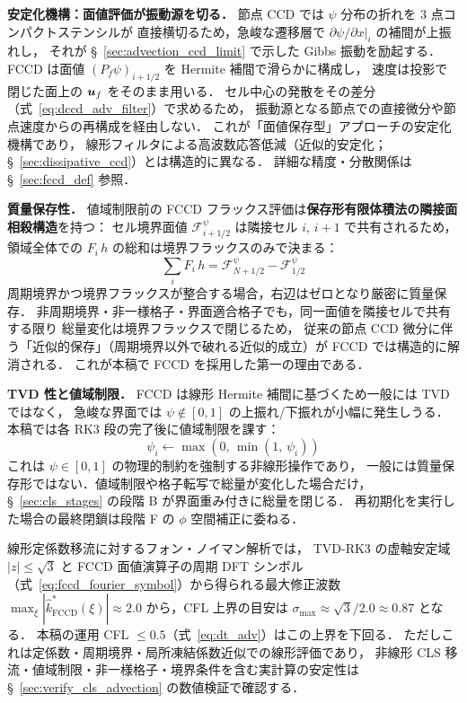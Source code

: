 \medskip
\noindent\textbf{安定化機構：面値評価が振動源を切る．}
節点 CCD では $\psi$ 分布の折れを 3 点コンパクトステンシルが
直接横切るため，急峻な遷移層で $\partial\psi/\partial x|_i$ の補間が上振れし，
それが §~\ref{sec:advection_ccd_limit} で示した Gibbs 振動を励起する．
FCCD は面値 $(P_f\psi)_{i+1/2}$ を Hermite 補間で滑らかに構成し，
速度は投影で閉じた面上の $\bm{u}_f$ をそのまま用いる．
セル中心の発散をその差分（式~\eqref{eq:dccd_adv_filter}）で求めるため，
振動源となる節点での直接微分や節点速度からの再構成を経由しない．
これが「面値保存型」アプローチの安定化機構であり，
線形フィルタによる高波数応答低減（近似的安定化；§~\ref{sec:dissipative_ccd}）とは構造的に異なる．
詳細な精度・分散関係は §~\ref{sec:fccd_def} 参照．

\medskip
\noindent\textbf{質量保存性．}
値域制限前の FCCD フラックス評価は\textbf{保存形有限体積法の隣接面相殺構造}を持つ：
セル境界面値 $\mathcal{F}^{\psi}_{i+1/2}$ は隣接セル $i,\,i+1$ で共有されるため，
領域全体での $F_i\,h$ の総和は境界フラックスのみで決まる：
\[
  \sum_i F_i\,h = \mathcal{F}^{\psi}_{N+1/2} - \mathcal{F}^{\psi}_{1/2}
\]
周期境界かつ境界フラックスが整合する場合，右辺はゼロとなり厳密に質量保存．
非周期境界・非一様格子・界面適合格子でも，同一面値を隣接セルで共有する限り
総量変化は境界フラックスで閉じるため，
従来の節点 CCD 微分に伴う「近似的保存」（周期境界以外で破れる近似的成立）が
FCCD では構造的に解消される．
これが本稿で FCCD を採用した第一の理由である．

\medskip
\noindent\textbf{TVD 性と値域制限．}
FCCD は線形 Hermite 補間に基づくため一般には TVD ではなく，
急峻な界面では $\psi \notin [0,1]$ の上振れ/下振れが小幅に発生しうる．
本稿では各 RK3 段の完了後に値域制限を課す：
\begin{equation}
  \psi_i \leftarrow \max(0,\,\min(1,\,\psi_i))
  \label{eq:psi_clamp}
\end{equation}
\label{warn:adv_clamp}%
これは $\psi \in [0,1]$ の物理的制約を強制する非線形操作であり，
一般には質量保存形ではない．値域制限や格子転写で総量が変化した場合だけ，
§~\ref{sec:cls_stages} の段階 B が界面重み付きに総量を閉じる．
再初期化を実行した場合の最終閉鎖は段階 F の $\phi$ 空間補正に委ねる．

\begin{tcolorbox}[warnbox, title={線形 CFL 上界の目安（FCCD + TVD-RK3，線形評価）}]
\label{result:dccd_stability}%
線形定係数移流に対するフォン・ノイマン解析では，
TVD-RK3 の虚軸安定域 $|z|\le\sqrt{3}$ と
FCCD 面値演算子の周期 DFT シンボル（式~\eqref{eq:fccd_fourier_symbol}）から得られる最大修正波数
$\max_\xi |\hat{k}^*_{\mathrm{FCCD}}(\xi)| \approx 2.0$
から，CFL 上界の目安は $\sigma_{\max} \approx \sqrt{3}/2.0 \approx 0.87$ となる．
本稿の運用 CFL $\leq 0.5$（式~\eqref{eq:dt_adv}）はこの上界を下回る．
ただしこれは定係数・周期境界・局所凍結係数近似での線形評価であり，
非線形 CLS 移流・値域制限・非一様格子・境界条件を含む実計算の安定性は
§~\ref{sec:verify_cls_advection} の数値検証で確認する．
\end{tcolorbox}

